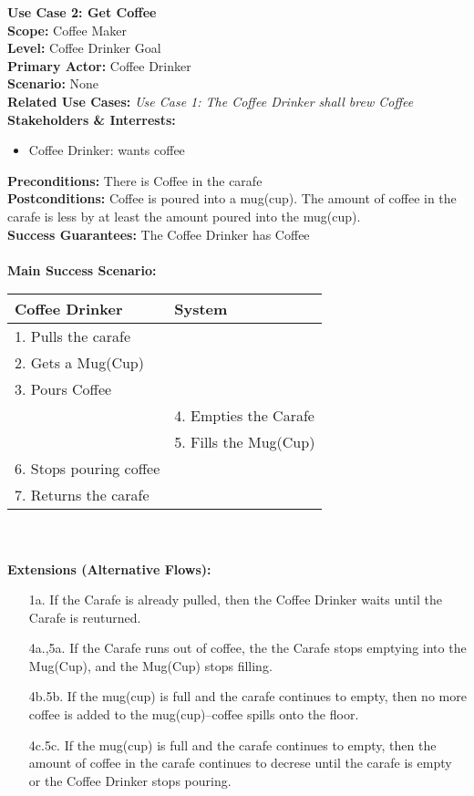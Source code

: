 \documentclass[letterpaper]{article}
\begin{document}
\noindent
\textbf{Use Case 2: Get Coffee}\\
\textbf{Scope: }Coffee Maker\\
\textbf{Level: }Coffee Drinker Goal\\
\textbf{Primary Actor: }Coffee Drinker\\
\textbf{Scenario: }None\\
\textbf{Related Use Cases:  }\textit{Use Case 1:  The Coffee Drinker
shall brew Coffee}\\
\textbf{Stakeholders \& Interrests: }
\begin{itemize}
\item Coffee Drinker:  wants coffee
\end{itemize}
\textbf{Preconditions: }There is Coffee in the carafe\\
\textbf{Postconditions: }Coffee is poured into a mug(cup).  The amount
of coffee in the carafe is less by at least the amount poured into the
mug(cup).\\
\textbf{Success Guarantees: }The Coffee Drinker has Coffee\\\\
\textbf{Main Success Scenario:  }\\
\begin{tabular}{|p{5.75cm}|p{5.75cm}|}\hline
\textbf{Coffee Drinker} & \textbf{System}\\\hline
1.  Pulls the carafe & \\\hline
2.  Gets a Mug(Cup) & \\\hline
3.  Pours Coffee & \\\hline
 & 4. Empties the Carafe\\\hline
 & 5. Fills the Mug(Cup)\\\hline
6. Stops pouring coffee & \\\hline
7. Returns the carafe & \\\hline
\end{tabular}\\\\
\textbf{Extensions (Alternative Flows): }
\begin{itemize}
\item[1a.] If the Carafe is already pulled, then the Coffee Drinker
waits until the Carafe is reuturned.
\item[4a.,5a.] If the Carafe runs out of coffee, the the Carafe stops
emptying into the Mug(Cup), and the Mug(Cup) stops filling.
\item[4b.5b.]If the mug(cup) is full and the carafe continues to
empty, then no more coffee is added to the mug(cup)--coffee spills
onto the floor.
\item[4c.5c.]If the mug(cup) is full and the carafe continues to
empty, then the amount of coffee in the carafe continues to decrese
until the carafe is empty or the Coffee Drinker stops pouring.
\end{itemize}
\end{document}
